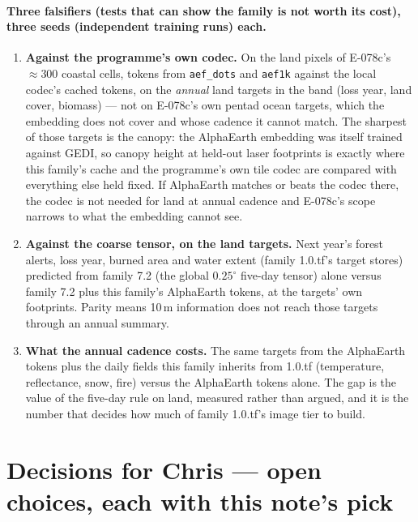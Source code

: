 \documentclass[10pt]{article}
\newcommand{\code}[1]{\texttt{#1}}
\begin{document}
\paragraph{Three falsifiers (tests that can show the family is not worth its cost), three seeds (independent training runs) each.}
\begin{enumerate}\itemsep2pt
\item \textbf{Against the programme's own codec.} On the land pixels of
E-078c's $\approx 300$ coastal cells, tokens from \code{aef\_dots} and
\code{aef1k} against the local codec's cached tokens, on the \emph{annual}
land targets in the band (loss year, land cover, biomass) --- not on E-078c's
own pentad ocean targets, which the embedding does not cover and whose
cadence it cannot match. The sharpest of those targets is the canopy: the
AlphaEarth embedding was itself trained against GEDI, so canopy height at
held-out laser footprints is exactly where this family's cache and the
programme's own tile codec are compared with everything else held fixed. If
AlphaEarth matches or beats the codec there,
the codec is not needed for land at annual cadence and E-078c's scope
narrows to what the embedding cannot see.
\item \textbf{Against the coarse tensor, on the land targets.} Next year's
forest alerts, loss year, burned area and water extent (family 1.0.tf's
target stores) predicted from family 7.2 (the global $0.25^\circ$ five-day tensor) alone versus family 7.2 plus this
family's AlphaEarth tokens, at the targets' own footprints. Parity means 10\,m
information does not reach those targets through an annual summary.
\item \textbf{What the annual cadence costs.} The same targets from the AlphaEarth
tokens plus the daily fields this family inherits from 1.0.tf (temperature, reflectance, snow,
fire) versus the AlphaEarth tokens alone. The gap is the value of the five-day rule on
land, measured rather than argued, and it is the number that decides how
much of family 1.0.tf's image tier to build.
\end{enumerate}

\section{Decisions for Chris --- open choices, each with this note's pick}
\end{document}
